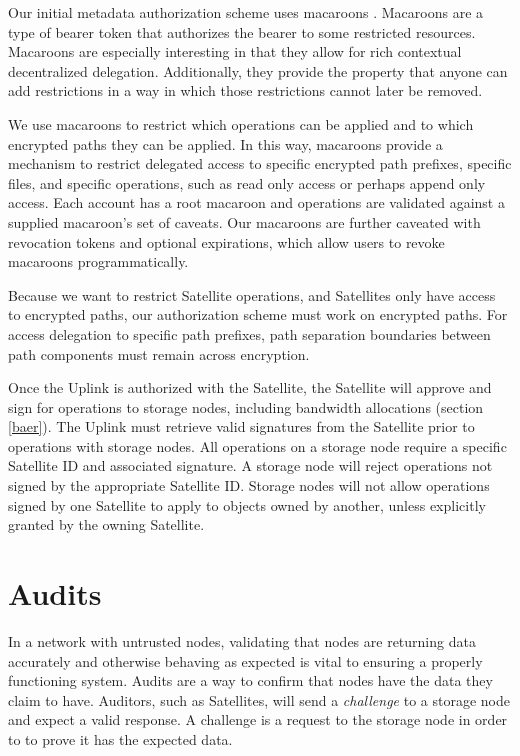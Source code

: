 \documentclass[8pt,fleqn,openany]{book}
\begin{document}
Our initial metadata authorization scheme uses macaroons \cite{macaroons}.
Macaroons are a type of bearer token that authorizes
the bearer to some restricted resources. Macaroons are especially interesting
in that they allow for rich contextual decentralized delegation. Additionally, they
provide the property that anyone can add restrictions in a way in which those
restrictions cannot later be removed.

We use macaroons to restrict which operations can be applied and to which
encrypted paths they can be applied. In this way, macaroons provide a
mechanism to restrict delegated access to specific encrypted path prefixes,
specific files, and specific operations, such as read only access or perhaps
append only access.
Each account has a root macaroon and operations are validated against a supplied
macaroon's set of caveats.
Our macaroons are further caveated with revocation tokens and optional
expirations, which allow users to revoke macaroons programmatically.

Because we want to restrict Satellite operations, and Satellites only have access
to encrypted paths, our authorization scheme must work on encrypted paths. For
access delegation to specific path prefixes, path separation boundaries between
path components must remain across encryption.

Once the Uplink is authorized with the Satellite, the Satellite will approve
and sign for operations to storage nodes, including bandwidth allocations
(section \ref{baer}).
The Uplink must retrieve valid signatures from the Satellite
prior to operations with storage nodes.
All operations on a storage node require a specific Satellite ID and associated
signature.
A storage node will reject operations not signed by the appropriate
Satellite ID. Storage nodes will not allow
operations signed by one Satellite to apply to objects owned by another, unless
explicitly granted by the owning Satellite.

\section{Audits}\label{sec:concrete-audits}

In a network with untrusted nodes, validating that nodes are returning data
accurately and otherwise behaving as expected is vital to ensuring a properly
functioning system. Audits are a way to confirm that nodes have the data they
claim to have. Auditors, such as Satellites, will send a {\em challenge} to a
storage node and expect a valid response. A challenge is a request to the
storage node in order to to prove it has the expected data.
\end{document}
